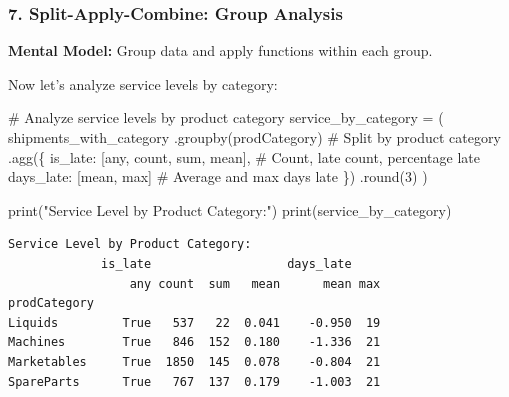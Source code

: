 \documentclass[
  letterpaper,
  DIV=11,
  numbers=noendperiod]{scrartcl}
\newenvironment{Shaded}{\begin{snugshade}}{\end{snugshade}}
\newcommand{\BuiltInTok}[1]{\textcolor[rgb]{0.00,0.23,0.31}{#1}}
\newcommand{\CommentTok}[1]{\textcolor[rgb]{0.37,0.37,0.37}{#1}}
\newcommand{\DecValTok}[1]{\textcolor[rgb]{0.68,0.00,0.00}{#1}}
\newcommand{\NormalTok}[1]{\textcolor[rgb]{0.00,0.23,0.31}{#1}}
\newcommand{\OperatorTok}[1]{\textcolor[rgb]{0.37,0.37,0.37}{#1}}
\newcommand{\StringTok}[1]{\textcolor[rgb]{0.13,0.47,0.30}{#1}}
\begin{document}
\subsubsection{7. Split-Apply-Combine: Group
Analysis}\label{split-apply-combine-group-analysis}

\textbf{Mental Model:} Group data and apply functions within each group.

Now let's analyze service levels by category:

\label{mental-model-7-groupby}
\begin{Shaded}
\begin{Highlighting}[]
\CommentTok{\# Analyze service levels by product category}
\NormalTok{service\_by\_category }\OperatorTok{=}\NormalTok{ (}
\NormalTok{    shipments\_with\_category}
\NormalTok{    .groupby(}\StringTok{\textquotesingle{}prodCategory\textquotesingle{}}\NormalTok{)  }\CommentTok{\# Split by product category}
\NormalTok{    .agg(\{}
        \StringTok{\textquotesingle{}is\_late\textquotesingle{}}\NormalTok{: [}\StringTok{\textquotesingle{}any\textquotesingle{}}\NormalTok{, }\StringTok{\textquotesingle{}count\textquotesingle{}}\NormalTok{, }\StringTok{\textquotesingle{}sum\textquotesingle{}}\NormalTok{, }\StringTok{\textquotesingle{}mean\textquotesingle{}}\NormalTok{],  }\CommentTok{\# Count, late count, percentage late}
        \StringTok{\textquotesingle{}days\_late\textquotesingle{}}\NormalTok{: [}\StringTok{\textquotesingle{}mean\textquotesingle{}}\NormalTok{, }\StringTok{\textquotesingle{}max\textquotesingle{}}\NormalTok{]  }\CommentTok{\# Average and max days late}
\NormalTok{    \})}
\NormalTok{    .}\BuiltInTok{round}\NormalTok{(}\DecValTok{3}\NormalTok{)}
\NormalTok{)}

\BuiltInTok{print}\NormalTok{(}\StringTok{"Service Level by Product Category:"}\NormalTok{)}
\BuiltInTok{print}\NormalTok{(service\_by\_category)}
\end{Highlighting}
\end{Shaded}

\begin{verbatim}
Service Level by Product Category:
             is_late                   days_late    
                 any count  sum   mean      mean max
prodCategory                                        
Liquids         True   537   22  0.041    -0.950  19
Machines        True   846  152  0.180    -1.336  21
Marketables     True  1850  145  0.078    -0.804  21
SpareParts      True   767  137  0.179    -1.003  21
\end{verbatim}
\end{document}
